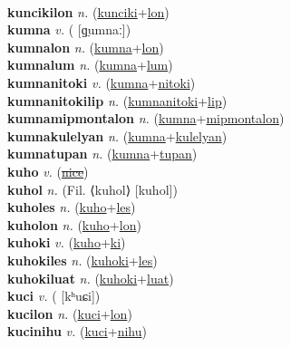  \label{kuncikiles} \\
\textbf{kuncikilon} \textit{n.} (\hyperref[kunciki]{kunciki}+\hyperref[lon]{lon})
 \label{kuncikilon} \\
\textbf{kumna} \textit{v.} ( [ɡ̤umnaː])
 \label{kumna} \\
\textbf{kumnalon} \textit{n.} (\hyperref[kumna]{kumna}+\hyperref[lon]{lon})
 \label{kumnalon} \\
\textbf{kumnalum} \textit{n.} (\hyperref[kumna]{kumna}+\hyperref[lum]{lum})
 \label{kumnalum} \\
\textbf{kumnanitoki} \textit{v.} (\hyperref[kumna]{kumna}+\hyperref[nitoki]{nitoki})
 \label{kumnanitoki} \\
\textbf{kumnanitokilip} \textit{n.} (\hyperref[kumnanitoki]{kumnanitoki}+\hyperref[lip]{lip})
 \label{kumnanitokilip} \\
\textbf{kumnamipmontalon} \textit{n.} (\hyperref[kumna]{kumna}+\hyperref[mipmontalon]{mipmontalon})
 \label{kumnamipmontalon} \\
\textbf{kumnakulelyan} \textit{n.} (\hyperref[kumna]{kumna}+\hyperref[kulelyan]{kulelyan})
 \label{kumnakulelyan} \\
\textbf{kumnatupan} \textit{n.} (\hyperref[kumna]{kumna}+\hyperref[tupan]{tupan})
 \label{kumnatupan} \\
\textbf{kuho} \textit{v.} (\hyperref[nice]{\sout{nice}})
 \label{kuho} \\
\textbf{kuhol} \textit{n.} (Fil. ⟨kuhol⟩ [kuhol])
 \label{kuhol} \\
\textbf{kuholes} \textit{n.} (\hyperref[kuho]{kuho}+\hyperref[les]{les})
 \label{kuholes} \\
\textbf{kuholon} \textit{n.} (\hyperref[kuho]{kuho}+\hyperref[lon]{lon})
 \label{kuholon} \\
\textbf{kuhoki} \textit{v.} (\hyperref[kuho]{kuho}+\hyperref[ki]{ki})
 \label{kuhoki} \\
\textbf{kuhokiles} \textit{n.} (\hyperref[kuhoki]{kuhoki}+\hyperref[les]{les})
 \label{kuhokiles} \\
\textbf{kuhokiluat} \textit{n.} (\hyperref[kuhoki]{kuhoki}+\hyperref[luat]{luat})
 \label{kuhokiluat} \\
\textbf{kuci} \textit{v.} ( [kʰuɕi])
 \label{kuci} \\
\textbf{kucilon} \textit{n.} (\hyperref[kuci]{kuci}+\hyperref[lon]{lon})
 \label{kucilon} \\
\textbf{kucinihu} \textit{v.} (\hyperref[kuci]{kuci}+\hyperref[nihu]{nihu})
 \label{kucinihu} \\
